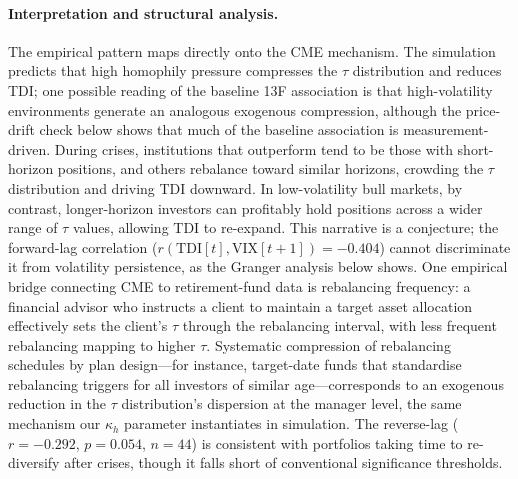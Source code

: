 \documentclass[preprint,12pt,authoryear]{elsarticle}
\begin{document}
\paragraph{Interpretation and structural analysis.}
The empirical pattern maps directly onto the CME mechanism.
The simulation predicts that high homophily pressure compresses the $\tau$
distribution and reduces TDI; one possible reading of the baseline 13F
association is that high-volatility environments generate an analogous
exogenous compression, although the price-drift check below shows that much
of the baseline association is measurement-driven.
During crises, institutions that outperform tend to be those with
short-horizon positions, and others rebalance toward similar horizons,
crowding the $\tau$ distribution and driving TDI downward.
In low-volatility bull markets, by contrast, longer-horizon investors can
profitably hold positions across a wider range of $\tau$ values, allowing
TDI to re-expand.
This narrative is a conjecture; the forward-lag correlation
($r(\mathrm{TDI}[t],\mathrm{VIX}[t+1]) = -0.404$) cannot discriminate it
from volatility persistence, as the Granger analysis below shows.
One empirical bridge connecting CME to retirement-fund data is
rebalancing frequency: a financial advisor who instructs a client to
maintain a target asset allocation effectively sets the client's $\tau$
through the rebalancing interval, with less frequent rebalancing mapping
to higher $\tau$.
Systematic compression of rebalancing schedules by plan design---for
instance, target-date funds that standardise rebalancing triggers for
all investors of similar age---corresponds to an exogenous reduction in
the $\tau$ distribution's dispersion at the manager level, the same
mechanism our $\kappa_h$ parameter instantiates in simulation.
The reverse-lag ($r = -0.292$, $p = 0.054$, $n = 44$) is consistent with
portfolios taking time to re-diversify after crises, though it falls
short of conventional significance thresholds.
\end{document}
